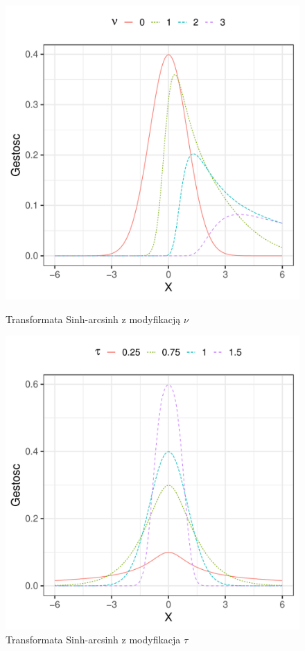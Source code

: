 \documentclass{article}
\theoremstyle{break}
\begin{document}
	\begin{figure}[H]
		\begin{center}
			\begin{minipage}{0.4\linewidth}
				\centering
				\includegraphics[scale=0.4]{skos.pdf}
				\caption{Transformata Sinh-arcsinh z modyfikacją $\nu$}
				\label{fig:skos}
			\end{minipage}
		\qquad \qquad
			\begin{minipage}{0.4\linewidth}
				\centering
				\includegraphics[scale=0.4]{kurt.pdf}
				\caption{Transformata Sinh-arcsinh z modyfikacja $\tau$}
				\label{fig:kurt}
			\end{minipage}
		\end{center}
	\end{figure}
\end{document}

